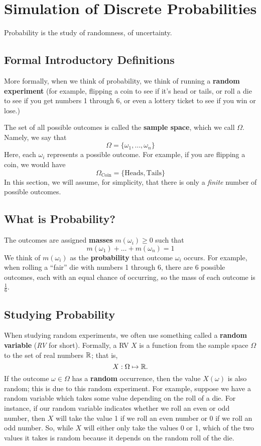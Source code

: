 \documentclass[letterpaper]{article}
\begin{document}
\section{Simulation of Discrete Probabilities}
Probability is the study of randomness, of uncertainty.

\subsection{Formal Introductory Definitions}
More formally, when we think of probability, we think of running a \textbf{random experiment} (for example, flipping a coin to see if it's head or tails, or roll a die to see if you get numbers 1 through 6, or even a lottery ticket to see if you win or lose.) 

\bigskip 

The set of all possible outcomes is called the \textbf{sample space}, which we call $\Omega$. Namely, we say that 
\[\Omega = \{\omega_1, \dots, \omega_n\}\]
Here, each $\omega_i$ represents a possible outcome. For example, if you are flipping a coin, we would have 
\[\Omega_{\text{Coin}} = \{\text{Heads}, \text{Tails}\}\]
In this section, we will assume, for simplicity, that there is only a \emph{finite} number of possible outcomes. 

\subsection{What is Probability?}
The outcomes are assigned \textbf{masses} $m(\omega_i) \geq 0$ such that 
\[m(\omega_1) + \dots + m(\omega_n) = 1\]
We think of $m(\omega_i)$ as the \textbf{probability} that outcome $\omega_i$ occurs. For example, when rolling a ``fair'' die with numbers 1 through 6, there are 6 possible outcomes, each with an equal chance of occurring, so the mass of each outcome is $\frac{1}{6}$. 

\subsection{Studying Probability}
When studying random experiments, we often use something called a \textbf{random variable} (\emph{RV} for short). Formally, a RV $X$ is a function from the sample space $\Omega$ to the set of real numbers $\mathbb{R}$; that is,
\[X: \Omega \mapsto \mathbb{R}.\]
If the outcome $\omega \in \Omega$ has a \textbf{random} occurrence, then the value $X(\omega)$ is also random; this is due to this random experiment. For example, suppose we have a random variable which takes some value depending on the roll of a die. For instance, if our random variable indicates whether we roll an even or odd number, then $X$ will take the value 1 if we roll an even number or 0 if we roll an odd number. So, while $X$ will either only take the values 0 or 1, which of the two values it takes is random because it depends on the random roll of the die. 
\end{document}
